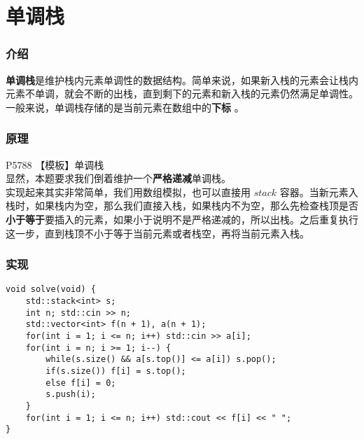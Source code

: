 \documentclass{beamer}
\newcommand{\fdf}[1]{\alert{\textbf{#1}}}
\begin{document}
\section{单调栈}
\begin{frame}
\frametitle{介绍}
\fdf{单调栈}是维护栈内元素单调性的数据结构。简单来说，如果新入栈的元素会让栈内元素不单调，就会不断的出栈，直到剩下的元素和新入栈的元素仍然满足单调性。\\ 
一般来说，单调栈存储的是当前元素在数组中的\fdf{下标} 。
\end{frame}
\begin{frame}
\frametitle{原理}
P5788 【模板】单调栈\\
显然，本题要求我们倒着维护一个\fdf{严格递减}单调栈。\\
实现起来其实非常简单，我们用数组模拟，也可以直接用 $stack$ 容器。当新元素入栈时，如果栈内为空，那么我们直接入栈，如果栈内不为空，那么先检查栈顶是否\fdf{小于等于}要插入的元素，如果小于说明不是严格递减的，所以出栈。之后重复执行这一步，直到栈顶不小于等于当前元素或者栈空，再将当前元素入栈。
\end{frame}
\begin{frame}[fragile]
\frametitle{实现}
\begin{onlyenv}
\begin{verbatim}
void solve(void) {
    std::stack<int> s;
    int n; std::cin >> n;
    std::vector<int> f(n + 1), a(n + 1);
    for(int i = 1; i <= n; i++) std::cin >> a[i]; 
    for(int i = n; i >= 1; i--) {
        while(s.size() && a[s.top()] <= a[i]) s.pop();
        if(s.size()) f[i] = s.top();
        else f[i] = 0;
        s.push(i);
    }
    for(int i = 1; i <= n; i++) std::cout << f[i] << " ";
}
\end{verbatim}
\end{onlyenv}
\end{frame}
\end{document}
